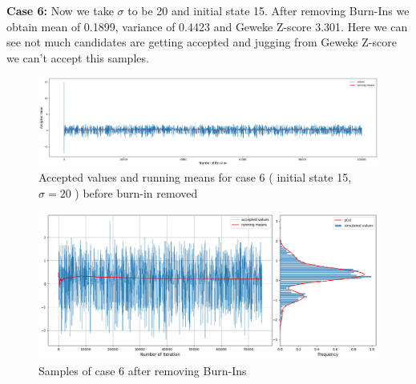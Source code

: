 \begin{example}
    \textbf{Case 6:} Now we take $ \sigma $ to be 20 and initial state 15. After removing Burn-Ins we obtain mean of 0.1899, variance of 0.4423 and Geweke Z-score 3.301. Here we can see not much candidates are getting accepted and jugging from Geweke Z-score we can't accept this samples.

    \begin{figure}[H]
        \centering
        \includegraphics[width=1\textwidth]{./images/metropolis/example1/sample-6-values.png}
        \caption{Accepted values and running means for case 6 ( initial state 15, $ \sigma = 20 $ ) before burn-in removed}
    \end{figure}

    \begin{figure}[H]
        \centering
        \includegraphics[width=1\textwidth]{./images/metropolis/example1/sample-6-value-hist-bo.png}
        \caption{Samples of case 6 after removing Burn-Ins}
    \end{figure}


\end{example}
